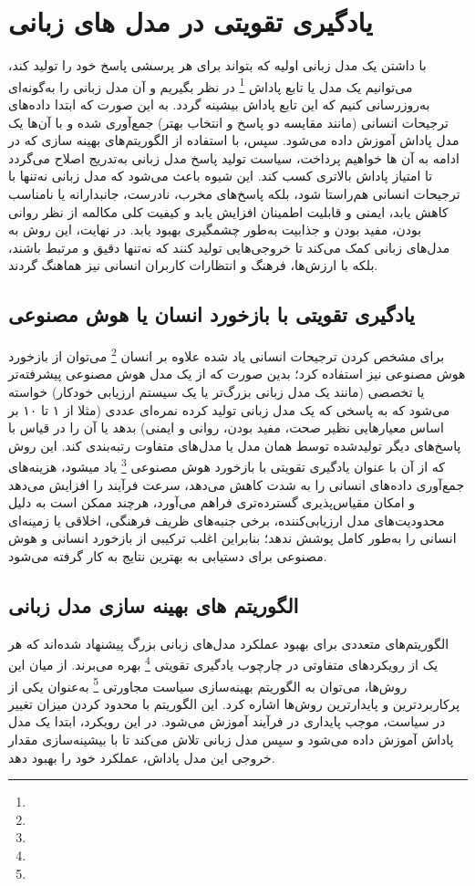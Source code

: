 \section{
یادگیری تقویتی در مدل های زبانی
}
با داشتن یک مدل زبانی اولیه که بتواند برای هر پرسشی پاسخ خود را تولید کند، می‌توانیم یک مدل یا تابع پاداش
\footnote{}
در نظر بگیریم و آن مدل زبانی را به‌گونه‌ای به‌روزرسانی کنیم که این تابع پاداش بیشینه گردد. به این صورت که ابتدا داده‌های ترجیحات انسانی (مانند مقایسه دو پاسخ و انتخاب بهتر) جمع‌آوری شده و با آن‌ها یک مدل پاداش آموزش داده می‌شود. سپس، با استفاده از الگوریتم‌های بهینه سازی که در ادامه به آن ها خواهیم پرداخت، سیاست تولید پاسخ مدل زبانی به‌تدریج اصلاح می‌گردد تا امتیاز پاداش بالاتری کسب کند. این شیوه باعث می‌شود که مدل زبانی نه‌تنها با ترجیحات انسانی هم‌راستا شود، بلکه پاسخ‌های مخرب، نادرست، جانبدارانه یا نامناسب کاهش یابد، ایمنی و قابلیت اطمینان افزایش یابد و کیفیت کلی مکالمه از نظر روانی بودن، مفید بودن و جذابیت به‌طور چشمگیری بهبود یابد. در نهایت، این روش به مدل‌های زبانی کمک می‌کند تا خروجی‌هایی تولید کنند که نه‌تنها دقیق و مرتبط باشند، بلکه با ارزش‌ها، فرهنگ و انتظارات کاربران انسانی نیز هماهنگ گردند.
\subsection{
یادگیری تقویتی با بازخورد انسان یا هوش مصنوعی
}
برای مشخص کردن ترجیحات انسانی یاد شده علاوه بر انسان
\footnote{}
\cite{b18}
می‌توان از بازخورد هوش مصنوعی نیز استفاده کرد؛ بدین صورت که از یک مدل هوش مصنوعی پیشرفته‌تر یا تخصصی (مانند یک مدل زبانی بزرگ‌تر یا یک سیستم ارزیابی خودکار) خواسته می‌شود که به پاسخی که یک مدل زبانی تولید کرده نمره‌ای عددی (مثلا از ۱ تا ۱۰ بر اساس معیارهایی نظیر صحت، مفید بودن، روانی و ایمنی) بدهد یا آن را در قیاس با پاسخ‌های دیگر تولیدشده توسط همان مدل یا مدل‌های متفاوت رتبه‌بندی کند. این روش که از آن با عنوان یادگیری تقویتی با بازخورد هوش مصنوعی
\cite{b19}
\footnote{}
یاد میشود، هزینه‌های جمع‌آوری داده‌های انسانی را به شدت کاهش می‌دهد، سرعت فرآیند را افزایش می‌دهد و امکان مقیاس‌پذیری گسترده‌تری فراهم می‌آورد، هرچند ممکن است به دلیل محدودیت‌های مدل ارزیابی‌کننده، برخی جنبه‌های ظریف فرهنگی، اخلاقی یا زمینه‌ای انسانی را به‌طور کامل پوشش ندهد؛ بنابراین اغلب ترکیبی از بازخورد انسانی و هوش مصنوعی برای دستیابی به بهترین نتایج به کار گرفته می‌شود.
\subsection{
الگوریتم های بهینه سازی مدل زبانی
}
الگوریتم‌های متعددی برای بهبود عملکرد مدل‌های زبانی بزرگ پیشنهاد شده‌اند که هر یک از رویکردهای متفاوتی در چارچوب یادگیری تقویتی
\footnote{}
بهره می‌برند. از میان این روش‌ها، می‌توان به الگوریتم بهینه‌سازی سیاست مجاورتی
\footnote{}
\cite{b20}
به‌عنوان یکی از پرکاربردترین و پایدارترین روش‌ها اشاره کرد. این الگوریتم با محدود کردن میزان تغییر در سیاست، موجب پایداری در فرآیند آموزش می‌شود. در این رویکرد، ابتدا یک مدل پاداش آموزش داده می‌شود و سپس مدل زبانی تلاش می‌کند تا با بیشینه‌سازی مقدار خروجی این مدل پاداش، عملکرد خود را بهبود دهد.

